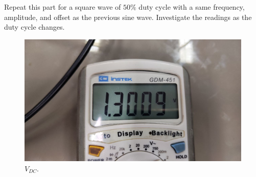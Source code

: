\documentclass[11pt]{article}
\newcommand{\PicScale}{0.2}
\begin{document}
\begin{question}
\begin{subquestion}{Repeat this part for a square wave of $50\%$ duty cycle with a same frequency, amplitude, and offset as the previous sine wave. Investigate the readings as the duty cycle changes.}
{    \begin{figure}[H]
        \begin{center}
            \includegraphics[scale=\PicScale]{Fig/35.jpeg}
            \caption{$V_{DC}$.}
        \end{center}
    \end{figure}
}
\end{subquestion}

\end{question}

\end{document}
